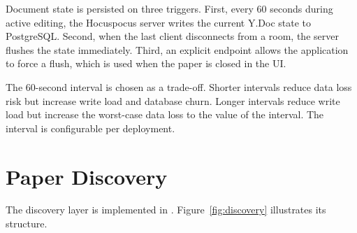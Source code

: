 Document state is persisted on three triggers. First, every 60 seconds during active editing, the Hocuspocus server writes the current Y.Doc state to PostgreSQL. Second, when the last client disconnects from a room, the server flushes the state immediately. Third, an explicit  endpoint allows the application to force a flush, which is used when the paper is closed in the UI.

The 60-second interval is chosen as a trade-off. Shorter intervals reduce data loss risk but increase write load and database churn. Longer intervals reduce write load but increase the worst-case data loss to the value of the interval. The interval is configurable per deployment.

\section{Paper Discovery}
\label{sec:paper-discovery}

The discovery layer is implemented in . Figure~\ref{fig:discovery} illustrates its structure.

